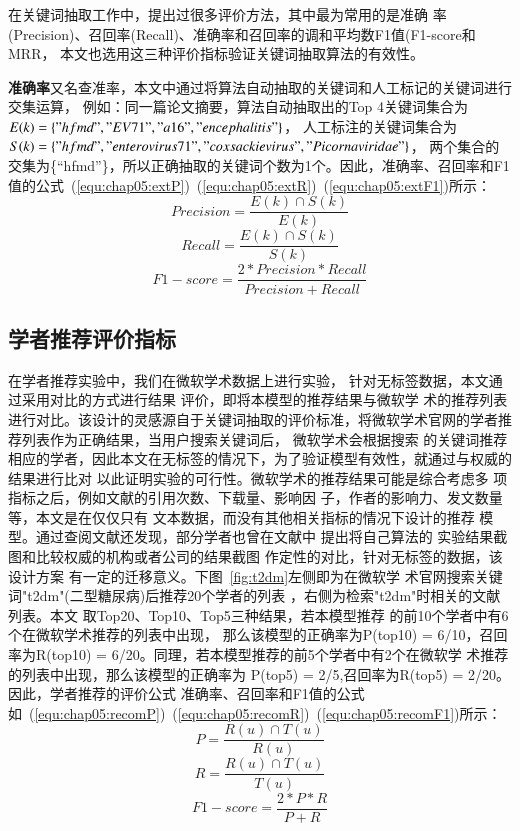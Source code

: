 在关键词抽取工作中，提出过很多评价方法，其中最为常用的是准确%
率(Precision)、召回率(Recall)、准确率和召回率的调和平均数F1值(F1-score和MRR，%
本文也选用这三种评价指标验证关键词抽取算法的有效性。

\textbf{准确率}又名查准率，本文中通过将算法自动抽取的关键词和人工标记的关键词进行交集运算，%
例如：同一篇论文摘要，算法自动抽取出的Top
4关键词集合为 $E(k) = \{"hfmd","EV71","a16","encephalitis"\}$，
人工标注的关键词集合为
$S(k) = \{"hfmd","enterovirus 71"," coxsackie virus","Picornaviridae"\}$， 两个集合的交集为\{“hfmd”\}，所以正确抽取的关键词个数为1个。因此，准确率、召回率和F1值的公式~(\ref{equ:chap05:extP})~(\ref{equ:chap05:extR})~(\ref{equ:chap05:extF1})所示：
\begin{equation}
\label{equ:chap05:extP}
Precision = \frac{E(k) \cap S(k)}{E(k)}
\end{equation}
\begin{equation}
\label{equ:chap05:extR}
Recall = \frac{E(k) \cap S(k)}{S(k)}
\end{equation}
\begin{equation}
\label{equ:chap05:extF1}
F1-score = \frac{2*Precision*Recall}{Precision+Recall}
\end{equation}

\subsection{学者推荐评价指标}
在学者推荐实验中，我们在微软学术数据上进行实验，%
针对无标签数据，本文通过采用对比的方式进行结果%
评价，即将本模型的推荐结果与微软学%
术的推荐列表进行对比。该设计的灵感源自于关键词抽取的评价标准，将微软学术官网的学者推%
荐列表作为正确结果，当用户搜索关键词后，%
微软学术会根据搜索%
的关键词推荐相应的学者，因此本文在无标签的情况下，为了验证模型有效性，就通过与权威的结果进行比对%
以此证明实验的可行性。微软学术的推荐结果可能是综合考虑多%
项指标之后，例如文献的引用次数、下载量、影响因%
子，作者的影响力、发文数量等，本文是在仅仅只有%
文本数据，而没有其他相关指标的情况下设计的推荐%
模型。通过查阅文献还发现，部分学者也曾在文献中%
提出将自己算法的%
实验结果截图和比较权威的机构或者公司的结果截图%
作定性的对比，针对无标签的数据，该设计方案%
有一定的迁移意义。下图~\ref{fig:t2dm}左侧即为在微软学%
术官网搜索关键词"t2dm"(二型糖尿病)后推荐20个学者的列表%
，右侧为检索"t2dm"时相关的文献列表。本文%
取Top20、Top10、Top5三种结果，若本模型推荐%
的前10个学者中有6个在微软学术推荐的列表中出现，%
那么该模型的正确率为P(top10) = 6/10，召回率为R(top10) = 6/20。同理，若本模型推荐的前5个学者中有2个在微软学%
术推荐的列表中出现，那么该模型的正确率为%
P(top5) = 2/5,召回率为R(top5) = 2/20。
因此，学者推荐的评价公式
准确率、召回率和F1值的公式如~(\ref{equ:chap05:recomP})~(\ref{equ:chap05:recomR})~(\ref{equ:chap05:recomF1})所示：
\begin{equation}
\label{equ:chap05:recomP}
P = \frac{R(u) \cap T(u)}{R(u)}
\end{equation}
\begin{equation}
\label{equ:chap05:recomR}
R = \frac{R(u) \cap T(u)}{T(u)}
\end{equation}
\begin{equation}
\label{equ:chap05:recomF1}
F1-score = \frac{2*P*R}{P+R}
\end{equation}

